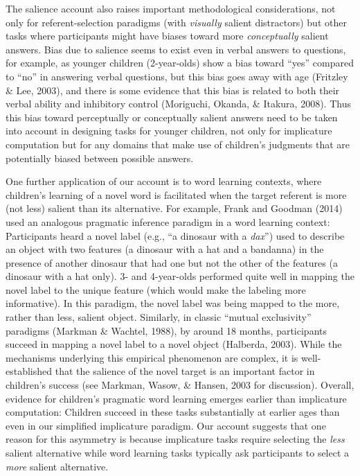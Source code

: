 \documentclass[man]{apa6}
\theoremstyle{definition}
\theoremstyle{definition}
\theoremstyle{definition}
\theoremstyle{remark}
\begin{document}
The salience account also raises important methodological
considerations, not only for referent-selection paradigms (with
\emph{visually} salient distractors) but other tasks where participants
might have biases toward more \emph{conceptually} salient answers. Bias
due to salience seems to exist even in verbal answers to questions, for
example, as younger children (2-year-olds) show a bias toward
\enquote{yes} compared to \enquote{no} in answering verbal questions,
but this bias goes away with age (Fritzley \& Lee, 2003), and there is
some evidence that this bias is related to both their verbal ability and
inhibitory control (Moriguchi, Okanda, \& Itakura, 2008). Thus this bias
toward perceptually or conceptually salient answers need to be taken
into account in designing tasks for younger children, not only for
implicature computation but for any domains that make use of children's
judgments that are potentially biased between possible answers.

One further application of our account is to word learning contexts,
where children's learning of a novel word is facilitated when the target
referent is more (not less) salient than its alternative. For example,
Frank and Goodman (2014) used an analogous pragmatic inference paradigm
in a word learning context: Participants heard a novel label (e.g.,
\enquote{a dinosaur with a \emph{dax}}) used to describe an object with
two features (a dinosaur with a hat and a bandanna) in the presence of
another dinosaur that had one but not the other of the features (a
dinosaur with a hat only). 3- and 4-year-olds performed quite well in
mapping the novel label to the unique feature (which would make the
labeling more informative). In this paradigm, the novel label was being
mapped to the more, rather than less, salient object. Similarly, in
classic \enquote{mutual exclusivity} paradigms (Markman \& Wachtel,
1988), by around 18 months, participants succeed in mapping a novel
label to a novel object (Halberda, 2003). While the mechanisms
underlying this empirical phenomenon are complex, it is well-established
that the salience of the novel target is an important factor in
children's success (see Markman, Wasow, \& Hansen, 2003 for discussion).
Overall, evidence for children's pragmatic word learning emerges earlier
than implicature computation: Children succeed in these tasks
substantially at earlier ages than even in our simplified implicature
paradigm. Our account suggests that one reason for this asymmetry is
because implicature tasks require selecting the \emph{less} salient
alternative while word learning tasks typically ask participants to
select a \emph{more} salient alternative.
\end{document}
